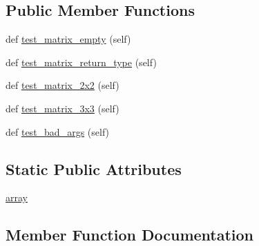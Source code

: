 \subsection*{Public Member Functions}
\begin{DoxyCompactItemize}
\item 
def \hyperlink{classnumpy_1_1linalg_1_1tests_1_1test__linalg_1_1__TestNorm2D_ae309fae30be0db987166b278e80e8fd0}{test\+\_\+matrix\+\_\+empty} (self)
\item 
def \hyperlink{classnumpy_1_1linalg_1_1tests_1_1test__linalg_1_1__TestNorm2D_aceb858e066569024e90d4d727bee57c6}{test\+\_\+matrix\+\_\+return\+\_\+type} (self)
\item 
def \hyperlink{classnumpy_1_1linalg_1_1tests_1_1test__linalg_1_1__TestNorm2D_a4413bf6ecd0c31fd00633ffbf06ce031}{test\+\_\+matrix\+\_\+2x2} (self)
\item 
def \hyperlink{classnumpy_1_1linalg_1_1tests_1_1test__linalg_1_1__TestNorm2D_a03a2323179d35811b4e4cc0f4e8fb773}{test\+\_\+matrix\+\_\+3x3} (self)
\item 
def \hyperlink{classnumpy_1_1linalg_1_1tests_1_1test__linalg_1_1__TestNorm2D_a0eedded7be852fbc4005cd51922e358a}{test\+\_\+bad\+\_\+args} (self)
\end{DoxyCompactItemize}
\subsection*{Static Public Attributes}
\begin{DoxyCompactItemize}
\item 
\hyperlink{classnumpy_1_1linalg_1_1tests_1_1test__linalg_1_1__TestNorm2D_aa450794b85e7ac283391f513c659bd39}{array}
\end{DoxyCompactItemize}


\subsection{Member Function Documentation}
\mbox{\label{classnumpy_1_1linalg_1_1tests_1_1test__linalg_1_1__TestNorm2D_a0eedded7be852fbc4005cd51922e358a}} 
